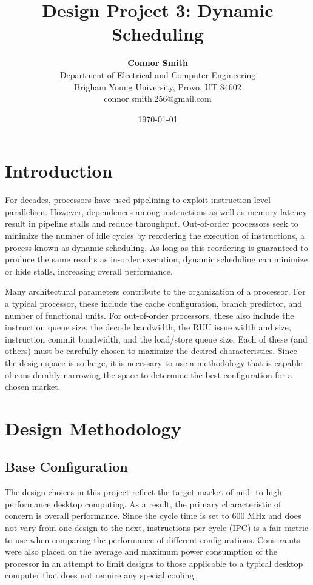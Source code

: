 \documentclass[english]{article}
\title{\vspace{-5.5ex} \bf Design Project 3: Dynamic Scheduling}
\author{{\bf Connor Smith} \\
	{\small Department of Electrical and Computer Engineering} \\
	{\small Brigham Young University, Provo, UT 84602} \\
	{\small connor.smith.256@gmail.com} \\
}
\date{\today}
\begin{document}
\doublespacing
\maketitle

\section{Introduction}
For decades, processors have used pipelining to exploit instruction-level parallelism. However, dependences among instructions as well as memory latency result in pipeline stalls and reduce throughput. Out-of-order processors seek to minimize the number of idle cycles by reordering the execution of instructions, a process known as dynamic scheduling. As long as this reordering is guaranteed to produce the same results as in-order execution, dynamic scheduling can minimize or hide stalls, increasing overall performance.

Many architectural parameters contribute to the organization of a processor. For a typical processor, these include the cache configuration, branch predictor, and number of functional units. For out-of-order processors, these also include the instruction queue size, the decode bandwidth, the RUU issue width and size, instruction commit bandwidth, and the load/store queue size. Each of these (and others) must be carefully chosen to maximize the desired characteristics. Since the design space is so large, it is necessary to use a methodology that is capable of considerably narrowing the space to determine the best configuration for a chosen market.

\section{Design Methodology}

\subsection{Base Configuration}
The design choices in this project reflect the target market of mid- to high-performance desktop computing. As a result, the primary characteristic of concern is overall performance. Since the cycle time is set to 600 MHz and does not vary from one design to the next, instructions per cycle (IPC) is a fair metric to use when comparing the performance of different configurations. Constraints were also placed on the average and maximum power consumption of the processor in an attempt to limit designs to those applicable to a typical desktop computer that does not require any special cooling.
\end{document}
